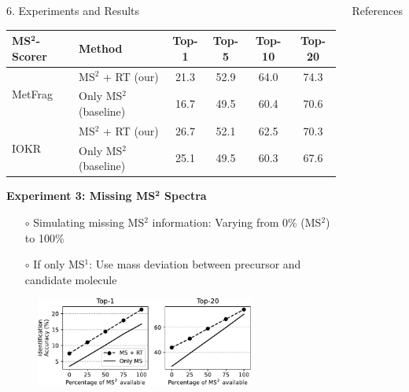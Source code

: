 \documentclass{beamer}
\newcommand{\ms}{MS}
\newcommand{\msone}{\ms$^1$}
\newcommand{\msms}{\ms$^2$}
\begin{document}
\begin{frame}{}
\begin{columns}[T]
\begin{block}{{\normalsize 6. Experiments and Results}}
\begin{itemize}
    \end{itemize}
        \begin{table}
            \centering
            \begin{tabular}{llcccc}
                \toprule
                {\bf \ms$^\mathbf{2}$-Scorer} & {\bf Method} & {\bf Top-1} & {\bf Top-5} & {\bf Top-10} & {\bf Top-20} \\ 
                \midrule
                    \multirow{2}{*}{MetFrag} &  \msms{} + RT (our) &   21.3 &   52.9 &    64.0 &    74.3 \\
                                             &  Only \msms{} (baseline) &   16.7 &   49.5 &    60.4 &    70.6 \\
                    \cmidrule(lr){1-6}
                    \multirow{2}{*}{IOKR} &  \msms{} + RT (our) &   26.7 &   52.1 &    62.5 &    70.3 \\
                                          &  Only \msms{} (baseline)&   25.1 &   49.5 &    60.3 &    67.6 \\
                \bottomrule
            \end{tabular}
        \end{table}
    \vspace{1cm}
    \textbf{Experiment 3: Missing \ms$^\mathbf{2}$ Spectra}
    \begin{itemize}
        \item[$\circ$] Simulating missing \msms{} information: Varying from 0\% (\msms) to 100\%
        \item[$\circ$] If only \msone{}: Use mass deviation between precursor and candidate molecule
    \end{itemize}
    \begin{figure}
        \centering
        \includegraphics[width=0.8\textwidth]{images/missing_ms2.pdf}
    \end{figure}
    \vspace{-0.75cm}
    \end{block}

\vfill

\begin{block}{\small References}
    
    \vspace{-0.75cm}
    \begin{multicols}{2}
        \begin{footnotesize}
            
        \end{footnotesize}
    \end{multicols} 
    \vspace{-0.35cm}
\end{block}


\end{columns}
\end{frame}
\end{document}
